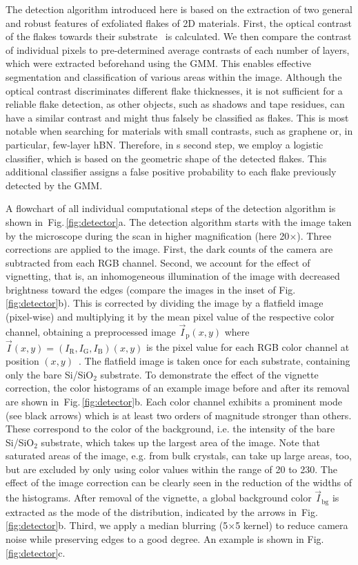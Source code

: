 \documentclass[reprint, prl, superscriptaddress, floatfix]{revtex4-2}
\newcommand{\fig}[1]{Fig.\,\ref{#1}}
\begin{document}
The detection algorithm introduced here is based on the extraction of two general and robust features of exfoliated flakes of 2D materials. 
First, the optical contrast of the flakes towards their substrate~\cite{Blake2007, Gao2008, Li2019Sep} is calculated.
We then compare the contrast of individual pixels to pre-determined average contrasts of each number of layers, which were extracted beforehand using the GMM. 
This enables effective segmentation and classification of various areas within the image.
Although the optical contrast discriminates different flake thicknesses, it is not sufficient for a reliable flake detection, as other objects, such as shadows and tape residues, can have a similar contrast and might thus falsely be classified as flakes.
This is most notable when searching for materials with  small contrasts, such as graphene or, in particular, few-layer hBN. 
Therefore, in s second step, we employ a logistic classifier, which is based on the geometric shape of the detected flakes.
This additional classifier assigns a false positive probability to each flake previously detected by the GMM.

A flowchart of all individual computational steps of the detection algorithm is shown in~\fig{fig:detector}a.
The detection algorithm starts with the image taken by the microscope during the scan in higher magnification (here 20$\times$).
Three corrections are applied to the image.
First, the dark counts of the camera are subtracted from each RGB channel.
Second, we account for the effect of vignetting, that is, an inhomogeneous illumination of the image with decreased brightness toward the edges (compare the images in the inset of \fig{fig:detector}b).
This is corrected by dividing the image by a flatfield image (pixel-wise) and multiplying it by the mean pixel value of the respective color channel, obtaining a preprocessed image $\vec{I}_{\mathrm{p}} (x,y)$ where $\vec{I} (x,y) = (I_\mathrm{R}, I_\mathrm{G}, I_\mathrm{B})(x,y)$ is the pixel value for each RGB color channel at position $(x,y)$~\cite{Seibert1998}.
The flatfield image is taken once for each substrate, containing only the bare Si/SiO$_2$ substrate.
To demonstrate the effect of the vignette correction, the color histograms of an example image before and after its removal are shown  in~\fig{fig:detector}b.
Each color channel exhibits a prominent mode (see black arrows) which is at least two orders of magnitude stronger than others.
These  correspond to the color of the background, i.e. the intensity of the bare Si/SiO$_2$ substrate, which takes up the largest area of the image.
Note that saturated areas of the image, e.g. from bulk crystals, can take up large areas, too, but are excluded by only using color values within the range of 20 to 230.
The effect of the image correction can be clearly seen in the reduction of the widths of the histograms.
After removal of the vignette, a global background color $\vec{I}_{\mathrm{bg}}$ is extracted as the mode of the distribution, indicated by the arrows in~\fig{fig:detector}b.
Third, we apply a median blurring (5$\times$5 kernel) to reduce camera noise while preserving edges to a good degree.
An example is shown in \fig{fig:detector}c.
\end{document}
